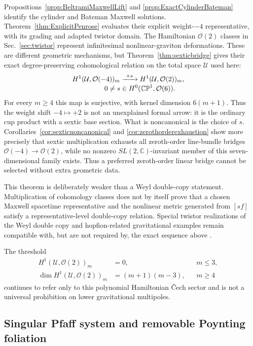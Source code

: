 \documentclass[aps,prd,reprint,nofootinbib,superscriptaddress]{revtex4-2}
\theoremstyle{definition}
\theoremstyle{remark}
\newcommand{\C}{\mathbb{C}}
\newcommand{\CP}{\mathbb{CP}}
\newcommand{\cO}{\mathcal{O}}
\newcommand{\cU}{\mathcal{U}}
\begin{document}
Propositions~\ref{prop:BeltramiMaxwellLift} and \ref{prop:ExactCylinderBateman} identify the cylinder and Bateman Maxwell solutions. Theorem~\ref{thm:ExplicitPenrose} evaluates their explicit weight-$-4$ representative, with its grading and adapted twistor domain. The Hamiltonian $\cO(2)$ classes in Sec.~\ref{sec:twistor} represent infinitesimal nonlinear-graviton deformations.  These are different geometric mechanisms, but Theorem~\ref{thm:sexticbridge} gives their exact degree-preserving cohomological relation on the total space $\cU$ used here:
\begin{align}
H^1(\cU,\cO(-4))_m
&\xrightarrow{\ \times s\ }H^1(\cU,\cO(2))_m,
\label{eq:architectureSextic}\\[-1mm]
&\hspace{-8mm}0\ne s\in H^0(\CP^1,\cO(6)).\nonumber
\end{align}
For every $m\ge4$ this map is surjective, with kernel dimension $6(m+1)$.  Thus the weight shift $-4\mapsto+2$ is not an unexplained formal arrow: it is the ordinary cup product with a sextic base section.  What is noncanonical is the choice of $s$.  Corollaries~\ref{cor:sexticnoncanonical} and \ref{cor:zerothorderexhaustion} show more precisely that sextic multiplication exhausts all zeroth-order line-bundle bridges $\cO(-4)\to\cO(2)$, while no nonzero $SL(2,\C)$-invariant member of this seven-dimensional family exists.  Thus a preferred zeroth-order linear bridge cannot be selected without extra geometric data.

This theorem is deliberately weaker than a Weyl double-copy statement.  Multiplication of cohomology classes does not by itself prove that a chosen Maxwell spacetime representative and the nonlinear metric generated from $[sf]$ satisfy a representative-level double-copy relation.  Special twistor realizations of the Weyl double copy and hopfion-related gravitational examples remain compatible with, but are not required by, the exact sequence above \cite{SabharwalDalhuisen2019,White2021}.

The threshold
\begin{align}
H^1(\cU,\cO(2))_m&=0, &&m\le3,\nonumber\\
\dim H^1(\cU,\cO(2))_m&=(m+1)(m-3), &&m\ge4
\label{eq:thresholdinterpretation}
\end{align}
continues to refer only to this polynomial Hamiltonian \v{C}ech sector and is not a universal prohibition on lower gravitational multipoles.

\subsection{Singular Pfaff system and removable Poynting foliation}
\end{document}
